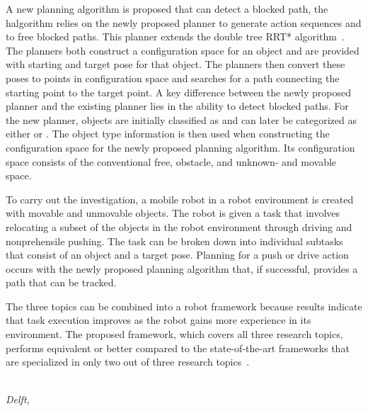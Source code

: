 A new planning algorithm is proposed that can detect a blocked path, the \acl{halgorithm} relies on the newly proposed planner to generate action sequences and to free blocked paths. This planner extends the double tree \acl{RRT*} algorithm~\cite{chen_fast_2018}. The planners both construct a configuration space for an object and are provided with starting and target pose for that object. The planners then convert these poses to points in configuration space and searches for a path connecting the starting point to the target point. A key difference between the newly proposed planner and the existing planner lies in the ability to detect blocked paths. For the new planner, objects are initially classified as  and can later be categorized as either  or . The object type information is then used when constructing the configuration space for the newly proposed planning algorithm. Its configuration space consists of the conventional free, obstacle, and unknown- and movable space.\bs

To carry out the investigation, a mobile robot in a robot environment is created with movable and unmovable objects. The robot is given a task that involves relocating a subset of the objects in the robot environment through driving and nonprehensile pushing. The task can be broken down into individual subtasks that consist of an object and a target pose. Planning for a push or drive action occurs with the newly proposed planning algorithm that, if successful, provides a path that can be tracked.\bs

The three topics can be combined into a robot framework because results indicate that task execution improves as the robot gains more experience in its environment. The proposed framework, which covers all three research topics, performs equivalent or better compared to the state-of-the-art frameworks that are specialized in only two out of three research topics~\cite{ellis_navigation_2022,sabbaghnovin_model_2021,scholz_navigation_2016,vega-brown_asymptotically_2020,wang_affordancebased_2020}.\bs

\begin{flushright}
{\makeatletter\itshape
    \@author\\
    Delft, \monthname{} \the\year{}
\makeatother}
\end{flushright}
